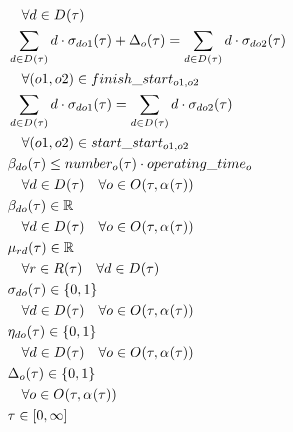 \begin{alignat}{2}
	& \quad \forall d \in D_{}(\tau) \notag\\
	& \sum_{d \in D_{}(\tau)} d \cdot \sigma_{do1}(\tau) + \Delta_{o}(\tau)  = \sum_{d \in D_{}(\tau)} d \cdot \sigma_{do2}(\tau)                   \notag  \\ 
	& \quad \forall (o1, o2) \in finish\_start_{o1, o2}                                                           \\ 
	& \sum_{d \in D_{}(\tau)} d \cdot \sigma_{do1}(\tau) = \sum_{d \in D_{}(\tau)} d \cdot \sigma_{do2}(\tau)  \notag                               \\ 
	& \quad \forall (o1, o2) \in start\_start_{o1, o2}                                                       \\ 
	& \beta_{do}(\tau) \leq number_{o}(\tau) \cdot operating\_time_{o} \notag                                                     \\ 
	& \quad \forall d \in D_{}(\tau) \quad \forall o \in O_{}(\tau, \alpha_{}(\tau))                                                                  \\
	& \beta_{do}(\tau) \in \mathbb{R} \quad \notag\\
	& \quad \forall d \in D_{}(\tau) \quad \forall o \in O_{}(\tau, \alpha_{}(\tau))                                         \\
	& \mu_{r d}(\tau) \in \mathbb{R} \quad\notag\\
	& \quad \forall r \in R(\tau) \quad \forall d \in D_{}(\tau)                                        \\
	& \sigma_{do}(\tau) \in \{0, 1\}\quad \notag\\
	& \quad \forall d \in D_{}(\tau) \quad \forall o \in O_{}(\tau, \alpha_{}(\tau)) \\
	& \eta_{do}(\tau) \in \{0, 1\}\quad \notag\\
	& \quad \forall d \in D_{}(\tau) \quad \forall o \in O_{}(\tau, \alpha_{}(\tau)) \\
	& \Delta_{o}(\tau) \in \{0, 1\} \\
	& \quad \forall o \in O_{}(\tau, \alpha_{}(\tau))                                      \\
	& \tau \in  [0, \infty] 
\end{alignat}

